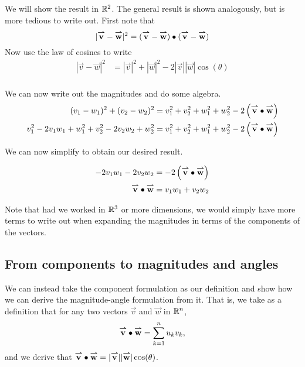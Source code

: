 \documentclass{ximera}
\begin{document}
  \begin{explanation}
    We will show the result in $\R^2$.  The general result is shown analogously, but is more tedious to write out.  First note that
    \[
    |\vec{v} - \vec{w}|^2 =  (\vec{v} - \vec{w})\dotp(\vec{v} - \vec{w})
    \]
    Now use the law of cosines to write
    \begin{align*}
      |\vec{v} - \vec{w}|^2&=|\vec{v}|^2+|\vec{w}|^2-2|\vec{v}||\vec{w}|\cos(\theta)\\
      \end{align*}
      
      We can now write out the magnitudes and do some algebra.
      \begin{align*}
  (v_1-w_1)^2 + (v_2-w_2)^2 &=v_1^2+v_2^2+w_1^2+w_2^2 -2\left(\vec{v} \dotp \vec{w}\right)\\
v_1^2-2v_1w_1+w_1^2 + v_2^2-2v_2w_2+w_2^2  &= v_1^2+v_2^2+w_1^2+w_2^2 -2\left(\vec{v} \dotp \vec{w}\right)\\
    \end{align*}
    
    We can now simplify to obtain our desired result.
    
         \begin{align*}
-2v_1w_1-2v_2w_2  &= -2\left(\vec{v} \dotp \vec{w}\right)\\
\vec{v} \dotp \vec{w} & = v_1w_1+v_2w_2
    \end{align*}

Note that had we worked in $\R^3$ or more dimensions, we would simply have more terms to write out when expanding the magnitudes in terms of the components of the vectors.     
  \end{explanation}


\subsection{From components to magnitudes and angles}

We can instead take the component formulation as our definition and show how we can derive the magnitude-angle formulation from it.  That is, we take as a definition that for any two vectors $\vec{v}$ and $\vec{w}$ in $\R^n$,
  \[
  \vec{v} \dotp \vec{w} = \sum_{k=1}^n u_kv_k,
  \]
 and we derive that $   \vec{v} \dotp \vec{w} = |\vec{v}||\vec{w}| \cos(\theta)$.
  
\end{document}
